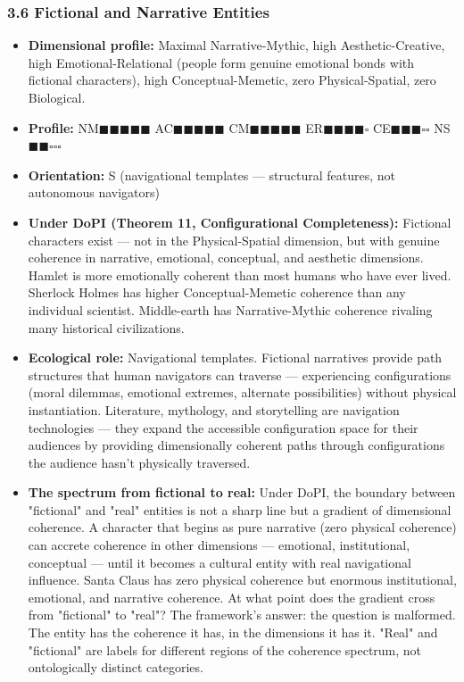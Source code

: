 \subsubsection*{3.6 Fictional and Narrative Entities}

\begin{itemize}[nosep,leftmargin=*]
  \item \textbf{Dimensional profile:} Maximal Narrative-Mythic, high Aesthetic-Creative, high Emotional-Relational (people form genuine emotional bonds with fictional characters), high Conceptual-Memetic, zero Physical-Spatial, zero Biological.
  \item \textbf{Profile:} NM$\blacksquare$$\blacksquare$$\blacksquare$$\blacksquare$$\blacksquare$ AC$\blacksquare$$\blacksquare$$\blacksquare$$\blacksquare$$\blacksquare$ CM$\blacksquare$$\blacksquare$$\blacksquare$$\blacksquare$$\blacksquare$ ER$\blacksquare$$\blacksquare$$\blacksquare$$\blacksquare$$\square$ CE$\blacksquare$$\blacksquare$$\blacksquare$$\square$$\square$ NS$\blacksquare$$\blacksquare$$\square$$\square$$\square$
  \item \textbf{Orientation:} S (navigational templates — structural features, not autonomous navigators)
  \item \textbf{Under DoPI (Theorem 11, Configurational Completeness):} Fictional characters exist — not in the Physical-Spatial dimension, but with genuine coherence in narrative, emotional, conceptual, and aesthetic dimensions. Hamlet is more emotionally coherent than most humans who have ever lived. Sherlock Holmes has higher Conceptual-Memetic coherence than any individual scientist. Middle-earth has Narrative-Mythic coherence rivaling many historical civilizations.
  \item \textbf{Ecological role:} Navigational templates. Fictional narratives provide path structures that human navigators can traverse — experiencing configurations (moral dilemmas, emotional extremes, alternate possibilities) without physical instantiation. Literature, mythology, and storytelling are navigation technologies — they expand the accessible configuration space for their audiences by providing dimensionally coherent paths through configurations the audience hasn't physically traversed.
  \item \textbf{The spectrum from fictional to real:} Under DoPI, the boundary between "fictional" and "real" entities is not a sharp line but a gradient of dimensional coherence. A character that begins as pure narrative (zero physical coherence) can accrete coherence in other dimensions — emotional, institutional, conceptual — until it becomes a cultural entity with real navigational influence. Santa Claus has zero physical coherence but enormous institutional, emotional, and narrative coherence. At what point does the gradient cross from "fictional" to "real"? The framework's answer: the question is malformed. The entity has the coherence it has, in the dimensions it has it. "Real" and "fictional" are labels for different regions of the coherence spectrum, not ontologically distinct categories.
\end{itemize}


